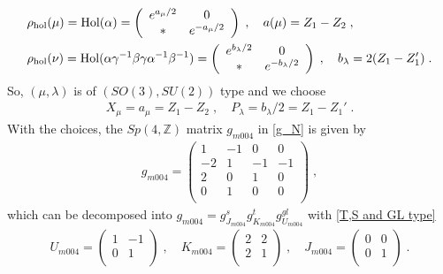 \documentclass[a4paper,11pt]{article}
\begin{document}
\begin{align}
\begin{split}
& \rho_{\rm hol}(\mu)=  {\rm Hol}(\alpha) = \left(\begin{array}{cc}e^{a_\mu /2}& 0 \\ * & e^{-a_\mu /2}\end{array}\right)\;, \quad a(\mu) =  Z_1-Z_2\;,
\\
& \rho_{\rm hol} (\nu) = {\rm Hol} (\alpha \gamma^{-1 }\beta \gamma \alpha^{-1}\beta^{-1})=  \left(\begin{array}{cc}e^{b_\lambda/2}& 0 \\ * & e^{-b_\lambda/2}\end{array}\right)\;, \quad b_\lambda = 2(Z_1-Z_1')\;.
\label{Hol-m004-2}
\end{split}
\end{align}
%
So, $(\mu,\lambda)$ is of $(SO(3),SU(2))$ type and we choose
%
\begin{align}
X_{\mu} = a_\mu = Z_1-Z_2\;, \quad P_{\lambda} = b_\lambda/2 = Z_1-Z_1'\;.
\end{align}
%
With the choices, the $Sp(4,\mathbb{Z})$ matrix $g_{m004}$ in \eqref{g_N} is given by
%
\begin{align}
g_{m004} = \left(
\begin{array}{cccc}
 1 & -1 & 0 & 0  \\
 -2 & 1 & -1 & -1 \\
 2 & 0 & 1 & 0 \\
 0 & 1 & 0 & 0 \\
\end{array}
\right)\;,
\end{align}
%
which can be decomposed into $g_{m004} = g^s_{J_{m004}} g^t_{K_{m004}} g^{gl}_{U_{m004}}$  with \eqref{T,S and GL type}
%
\begin{align}
U_{m004} = \left(
\begin{array}{cc}
 1 & -1  \\
 0 & 1  \\
\end{array}
\right)\;, \quad K_{m004} = \left(
\begin{array}{cc}
 2 & 2 \\
 2 & 1  \\
\end{array}
\right)\;, \quad J_{m004} = \left(
\begin{array}{cc}
 0 & 0  \\
 0 & 1  \\
\end{array}
\right)\;.
\end{align}
\end{document}
